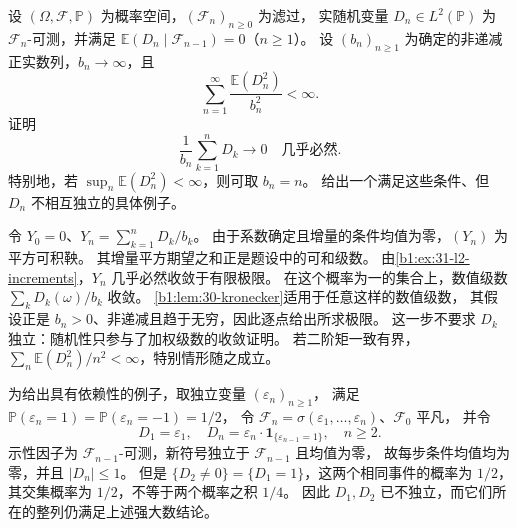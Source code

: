 \begin{optionalexercise}\label{b1:ex:31-martingale-strong-law}
设 \((\Omega,\mathcal F,\mathbb P)\) 为概率空间，\((\mathcal F_n)_{n\geq0}\) 为滤过，
实随机变量 \(D_n\in L^2(\mathbb P)\) 为 \(\mathcal F_n\)-可测，并满足
\(\mathbb E(D_n\mid\mathcal F_{n-1})=0\)（\(n\geq1\)）。
设 \((b_n)_{n\geq1}\) 为确定的非递减正实数列，\(b_n\to\infty\)，且
\[
 \sum_{n=1}^{\infty}\frac{\mathbb E(D_n^2)}{b_n^2}<\infty.
\]
证明
\[
 \frac1{b_n}\sum_{k=1}^nD_k\longrightarrow0\quad\text{几乎必然}.
\]
特别地，若 \(\sup_n\mathbb E(D_n^2)<\infty\)，则可取 \(b_n=n\)。
给出一个满足这些条件、但 \(D_n\) 不相互独立的具体例子。
\end{optionalexercise}
\begin{solution}
令 \(Y_0=0\)、\(Y_n=\sum_{k=1}^nD_k/b_k\)。
由于系数确定且增量的条件均值为零，\((Y_n)\) 为平方可积鞅。
其增量平方期望之和正是题设中的可和级数。
由\cref{b1:ex:31-l2-increments}，\(Y_n\) 几乎必然收敛于有限极限。
在这个概率为一的集合上，数值级数 \(\sum_kD_k(\omega)/b_k\) 收敛。
\cref{b1:lem:30-kronecker}适用于任意这样的数值级数，
其假设正是 \(b_n>0\)、非递减且趋于无穷，因此逐点给出所求极限。
这一步不要求 \(D_k\) 独立：随机性只参与了加权级数的收敛证明。
若二阶矩一致有界，\(\sum_n\mathbb E(D_n^2)/n^2<\infty\)，特别情形随之成立。

为给出具有依赖性的例子，取独立变量 \((\varepsilon_n)_{n\geq1}\)，
满足 \(\mathbb P(\varepsilon_n=1)=\mathbb P(\varepsilon_n=-1)=1/2\)，
令 \(\mathcal F_n=\sigma(\varepsilon_1,\ldots,\varepsilon_n)\)、\(\mathcal F_0\) 平凡，
并令
\[
 D_1=\varepsilon_1,\quad
 D_n=\varepsilon_n\cdot\mathbf1_{\{\varepsilon_{n-1}=1\}},\quad n\geq2.
\]
示性因子为 \(\mathcal F_{n-1}\)-可测，新符号独立于 \(\mathcal F_{n-1}\) 且均值为零，
故每步条件均值均为零，并且 \(|D_n|\leq1\)。
但是 \(\{D_2\ne0\}=\{D_1=1\}\)，这两个相同事件的概率为 \(1/2\)，
其交集概率为 \(1/2\)，不等于两个概率之积 \(1/4\)。
因此 \(D_1,D_2\) 已不独立，而它们所在的整列仍满足上述强大数结论。
\end{solution}
